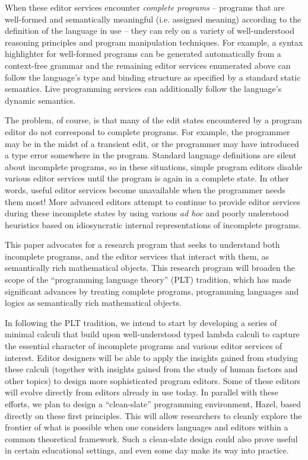 \documentclass[letterpaper,USenglish]{lipics-v2016}
\newcommand{\Hazel}[0]{\textsf{Hazel}}
\begin{document}
When these editor services encounter \emph{complete programs} -- programs that are well-formed and semantically meaningful (i.e. assigned meaning) according to the definition of the language in use -- they can rely on a variety of well-understood reasoning principles and program manipulation techniques. For example, a syntax highlighter for well-formed programs can be generated automatically 
from a context-free grammar \cite{DBLP:conf/tools/KrahnRV08,DBLP:conf/cc/BrandDHJJKKMOSVVV01} and the remaining editor services enumerated above can follow the language's type and binding structure as specified by a standard static
semantics. Live programming services can additionally follow the language's dynamic semantics.

The problem, of course, is that many of the {edit states} encountered by a program editor do not correspond to complete programs. For example, the programmer may be in the midst of a transient edit, or the programmer may have introduced a type error somewhere in the program. Standard language definitions are silent about incomplete programs, so in these situations, simple program editors disable various editor services until the program is again in a complete state. In other words, useful editor services become unavailable when the programmer needs them most! More advanced editors attempt to continue to provide editor services during these incomplete states by using various \emph{ad hoc} and poorly understood heuristics based on idiosyncratic internal representations of  incomplete programs.

This paper advocates for a research program that seeks to understand both incomplete programs, and the editor services that interact with them, as semantically rich mathematical objects. This research program will broaden the scope of the ``programming language theory'' (PLT) tradition, which has made significant advances by treating complete programs, programming languages and logics as semantically rich mathematical objects.

In following the PLT tradition, we intend to start by developing a series of minimal calculi that build upon well-understood typed lambda calculi to capture the essential character of incomplete programs and various editor services of interest. Editor designers will be able to apply the insights gained from studying these calculi (together with insights gained from the study of human factors and other topics) to design more sophisticated program editors. Some of these editors will evolve directly from editors already in use today. In parallel with these efforts, we plan to design a ``clean-slate'' programming environment, \Hazel, based directly on these first principles. This will allow researchers to cleanly explore the frontier of what is possible when one considers languages and editors within a common theoretical framework. Such a clean-slate design could also prove useful in certain educational settings, and even some day make its way into practice.
\end{document}
